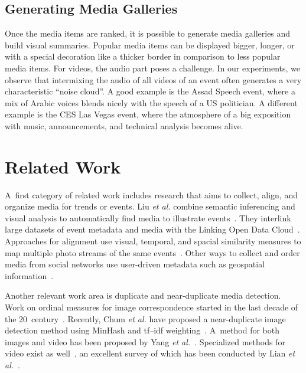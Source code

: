 \subsection{Generating Media Galleries}
Once the media items are ranked, it is possible to generate media galleries and build visual summaries. Popular media items can be displayed bigger, longer, or with a special decoration like a thicker border in comparison to less popular media items. For videos, the audio part poses a challenge. In our experiments, we observe that intermixing the audio of all videos of an event often generates a very characteristic ``noise cloud''. A good example is the Assad Speech event, where a mix of Arabic voices blends nicely with the speech of a US politician. A different example is the CES Las Vegas event, where the atmosphere of a big exposition with music, announcements, and technical analysis becomes alive.


\section{Related Work}                                                      \label{sec:related-work}

A~first category of related work includes research that aims to collect, align, and organize media for trends or events.
Liu \emph{et al.} combine semantic inferencing and visual analysis to automatically find media to illustrate events~\cite{Liu:ICMR11}.
They interlink large datasets of event metadata and media with the Linking Open Data Cloud~\cite{LODcloud}.
Approaches for alignment use visual, temporal, and spacial similarity measures to map multiple photo streams of the same events~\cite{Yang2011}.
Other ways to collect and order media from social networks use user-driven metadata such as geospatial information~\cite{Crandall}.

Another relevant work area is duplicate and near-duplicate media detection. Work on ordinal measures for image correspondence started in the last decade of the 20~century~\cite{Bhat}. Recently, Chum \emph{et al.} have proposed a near-duplicate image detection method using MinHash and tf--idf weighting~\cite{Chum}. A~method for both images and video has been proposed by Yang \emph{et al.}~\cite{Yang}. Specialized methods for video exist as well~\cite{Min, Wu}, an excellent survey of which has been conducted by Lian \emph{et al.}~\cite{Lian}.

